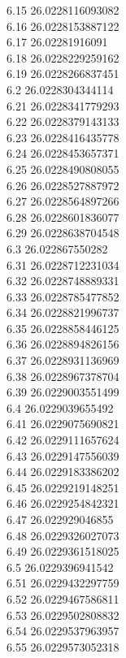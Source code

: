 {6.15	26.0228116093082\\
6.16	26.0228153887122\\
6.17	26.02281916091\\
6.18	26.0228229259162\\
6.19	26.0228266837451\\
6.2	26.0228304344114\\
6.21	26.0228341779293\\
6.22	26.0228379143133\\
6.23	26.0228416435778\\
6.24	26.0228453657371\\
6.25	26.0228490808055\\
6.26	26.0228527887972\\
6.27	26.0228564897266\\
6.28	26.0228601836077\\
6.29	26.0228638704548\\
6.3	26.022867550282\\
6.31	26.0228712231034\\
6.32	26.0228748889331\\
6.33	26.0228785477852\\
6.34	26.0228821996737\\
6.35	26.0228858446125\\
6.36	26.0228894826156\\
6.37	26.0228931136969\\
6.38	26.0228967378704\\
6.39	26.0229003551499\\
6.4	26.0229039655492\\
6.41	26.0229075690821\\
6.42	26.0229111657624\\
6.43	26.0229147556039\\
6.44	26.0229183386202\\
6.45	26.0229219148251\\
6.46	26.0229254842321\\
6.47	26.022929046855\\
6.48	26.0229326027073\\
6.49	26.0229361518025\\
6.5	26.0229396941542\\
6.51	26.0229432297759\\
6.52	26.0229467586811\\
6.53	26.0229502808832\\
6.54	26.0229537963957\\
6.55	26.0229573052318\\
}
